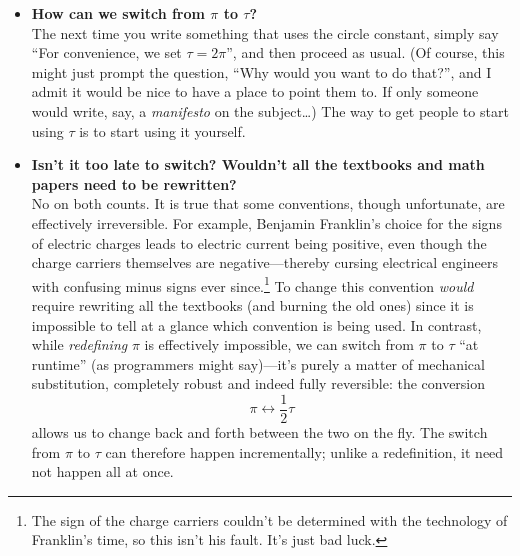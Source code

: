 \documentclass{article}
\begin{document}
\begin{itemize}
  \item \textbf{How can we switch from $\pi$ to $\tau$?} \\ The next time you write something that uses the circle constant, simply say ``For convenience, we set $\tau = 2\pi$'', and then proceed as usual. (Of course, this might just prompt the question, ``Why would you want to do that?'', and I admit it would be nice to have a place to point them to. If only someone would write, say, a \emph{manifesto} on the subject\ldots) The way to get people to start using $\tau$ is to start using it yourself. 

  
  \item \textbf{Isn't it too late to switch? Wouldn't all the textbooks and math papers need to be rewritten?} \\ No on both counts. It is true that some conventions, though unfortunate, are effectively irreversible. For example, Benjamin Franklin's choice for the signs of electric charges leads to electric current being positive, even though the charge carriers themselves are negative---thereby cursing electrical engineers with confusing minus signs ever since.\footnote{The sign of the charge carriers couldn't be determined with the technology of Franklin's time, so this isn't his fault. It's just bad luck.} To change this convention \emph{would} require rewriting all the textbooks (and burning the old ones) since it is impossible to tell at a glance which convention is being used. In contrast, while \emph{redefining} $\pi$ is effectively impossible, we can switch from $\pi$ to $\tau$ ``at runtime'' (as programmers might say)---it's purely a matter of mechanical substitution, completely robust and indeed fully reversible: the conversion \[ \pi \leftrightarrow \textstyle{\frac{1}{2}}\tau \] allows us to change back and forth between the two on the fly. The switch from $\pi$ to $\tau$ can therefore happen incrementally; unlike a redefinition, it need not happen all at once.



\end{itemize}
\end{document}
